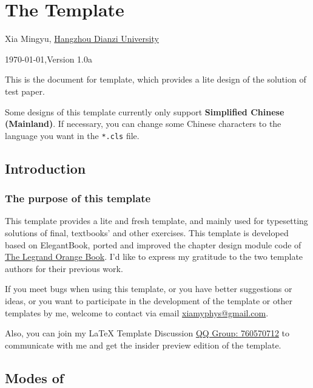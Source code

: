 \chapter{The  Template}
\fancyhead[R]{\color{H7}\rightmark\,}

\centerline{Xia Mingyu, \href{https://www.hdu.edu.cn}{Hangzhou Dianzi University}}
\ddmmyyyydate
\centerline{}
\centerline{\today,\quad Version 1.0a}

This is the document for  template, which provides a lite design of the solution of test paper.

Some designs of this template currently only support \textbf{Simplified Chinese (Mainland)}. If necessary, you can change some Chinese characters to the language you want in the \verb|*.cls| file.

\section{Introduction}
\subsection{The purpose of this template}
This template provides a lite and fresh template, and mainly used for typesetting solutions of final, textbooks' and other exercises. This template is developed based on ElegantBook, ported and improved the chapter design module code of \href{https://www.overleaf.com/latex/templates/the-legrand-orange-book-template-english/jtctyfmnpppc}{The Legrand Orange Book}. I'd like to express my gratitude to the two template authors for their previous work.

If you meet bugs when using this template, or you have better suggestions or ideas, or you want to participate in the development of the template or other templates by me, welcome to contact via email \href{mailto:xiamyphys@gmail.com}{xiamyphys@gmail.com}.

Also, you can join my \textsf\LaTeX{} Template Discussion \href{https://qm.qq.com/q/OnHzbNvVAG}{QQ Group: 760570712} to communicate with me and get the insider preview edition of the template.

\section{Modes of }
